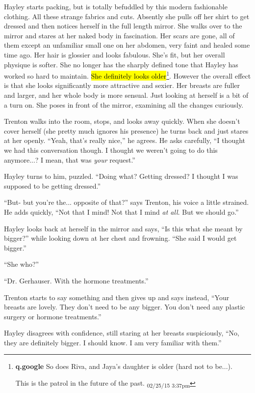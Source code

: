 Hayley starts packing, but is totally befuddled by this modern fashionable clothing.  All these strange fabrics and cuts.  Absently she pulls off her shirt to get dressed and then notices herself in the full length mirror.  She walks over to the mirror and stares at her naked body in fascination.  Her scars are gone, all of them except an unfamiliar small one on her abdomen, very faint and healed some time ago.  Her hair is glossier and looks fabulous.  She's fit, but her overall physique is softer.  She no longer has the sharply defined tone that Hayley has worked so hard to maintain.  \hl{She definitely looks older}\footnote{\textbf{q.google }So does Riva, and Jaya's daughter is older (hard not to be...).

This is the patrol in the future of the past. \textsubscript{02/25/15 3:37pm}}.  However the overall effect is that she looks significantly more attractive and sexier.  Her breasts are fuller and larger, and her whole body is more sensual.  Just looking at herself is a bit of a turn on.  She poses in front of the mirror, examining all the changes curiously.



Trenton walks into the room, stops, and looks away quickly.  When she doesn't cover herself (she pretty much ignores his presence) he turns back and just stares at her openly.  ``Yeah, that's really nice,'' he agrees.  He asks carefully, ``I thought we had this conversation though.  I thought we weren't going to do this anymore...?  I mean, that was \textit{your} request.''

Hayley turns to him, puzzled.  ``Doing what?  Getting dressed?  I thought I was supposed to be getting dressed.''

``But- but you're the... opposite of that?'' says Trenton, his voice a little strained.  He adds quickly, ``Not that I mind!  Not that I mind \textit{at all}.  But we should go.''

Hayley looks back at herself in the mirror and says, ``Is this what she meant by bigger?'' while looking down at her chest and frowning.  ``She said I would get bigger.''

``She who?''

``Dr. Gerhauser.  With the hormone treatments.''

Trenton starts to say something and then gives up and says instead, ``Your breasts are lovely. They don't need to be any bigger.  You don't need any plastic surgery or hormone treatments.''

Hayley disagrees with confidence, still staring at her breasts suspiciously, ``No, they are definitely bigger.  I should know.  I am very familiar with them.''

